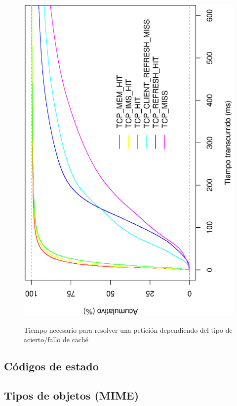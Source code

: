 \documentclass[twocolumn]{Jornadas}
\begin{document}
\begin{figure}[ht!]
\includegraphics[scale=0.30,angle=-90]{figures/ElapsedTimeAll_1k_full.eps} \label{fig:elapsed}
\caption{Tiempo necesario para resolver una petición dependiendo del tipo de acierto/fallo de caché}
\label{fig:elapsed}
\end{figure}

\subsection{Códigos de estado}


\subsection{Tipos de objetos (MIME)}
\label{mime}
\end{document}
